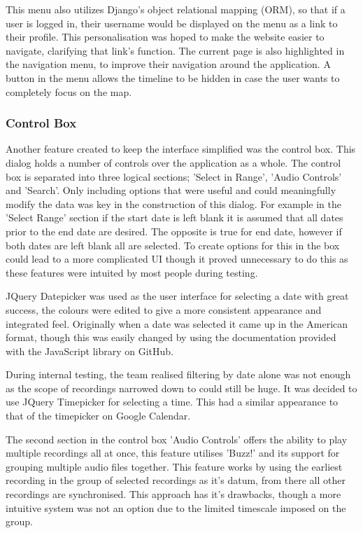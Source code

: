 \documentclass{l3proj}
\begin{document}
This menu also utilizes Django's object relational mapping (ORM), so that if a user is logged in, their username would be displayed on the menu as a link to their profile. This personalisation was hoped to make the website easier to navigate, clarifying that link's function. The current page is also highlighted in the navigation menu, to improve their navigation around the application. A button in the menu allows the timeline to be hidden in case the user wants to completely focus on the map.

\subsubsection{Control Box}		Another feature created to keep the interface simplified was the control box. This dialog holds a number of controls over the application as a whole. The control box is separated into three logical sections; 'Select in Range', 'Audio Controls' and 'Search'. Only including options that were useful and could meaningfully modify the data was key in the construction of this dialog. For example in the 'Select Range' section if the start date is left blank it is assumed that all dates prior to the end date are desired. The opposite is true for end date, however if both dates are left blank all are selected. To create options for this in the box could lead to a more complicated UI though it proved unnecessary to do this as these features were intuited by most people during testing.

\gls{JQuery} Datepicker\cite{jQueryDatepicker} was used as the user interface for selecting a date with great success, the colours were edited to give a more consistent appearance and integrated feel. Originally when a date was selected it came up in the American format, though this was easily changed by using the documentation provided with the \gls{JavaScript} library on GitHub.

During internal testing, the team realised filtering by date alone was not enough as the scope of recordings narrowed down to could still be huge. It was decided to use \gls{JQuery} Timepicker\cite{jQueryTimepicker} for selecting a time. This had a similar appearance to that of the timepicker on Google Calendar\cite{googleCalendar}.

The second section in the control box 'Audio Controls' offers the ability to play multiple recordings all at once, this feature utilises 'Buzz!' and its support for grouping multiple audio files together. This feature works by using the earliest recording in the group of selected recordings as it's datum, from there all other recordings are synchronised. This approach has it's drawbacks, though a more intuitive system was not an option due to the limited timescale imposed on the group.
\end{document}
